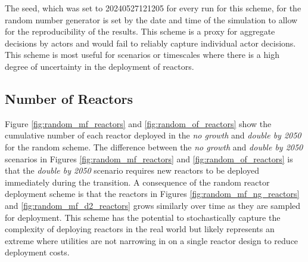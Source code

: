 
The seed, which was set to 20240527121205 for every run for this scheme, for
the random number generator is set by the date and time of the simulation to
allow for the reproducibility of the results. This scheme is a proxy for
aggregate decisions by actors and would fail to reliably capture individual
actor decisions. This scheme is most useful for scenarios or timescales where
there is a high degree of uncertainty in the deployment of reactors.


\subsection{Number of Reactors}
\label{sec:random_reactors}

Figure \ref{fig:random_mf_reactors} and \ref{fig:random_of_reactors} show the cumulative number of each reactor deployed in the \textit{no growth} and \textit{double by 2050} for the random scheme. The difference between the \textit{no growth} and \textit{double by 2050} scenarios in Figures \ref{fig:random_mf_reactors} and \ref{fig:random_of_reactors} is that the \textit{double by 2050} scenario requires new reactors to be deployed immediately during the transition. A consequence of the random reactor deployment scheme is that the reactors in Figures \ref{fig:random_mf_ng_reactors} and \ref{fig:random_mf_d2_reactors} grows similarly over time as they are sampled for deployment. This scheme has the potential to stochastically capture the complexity of deploying reactors in the real world but likely represents an extreme where utilities are not narrowing in on a single reactor design to reduce deployment costs.

